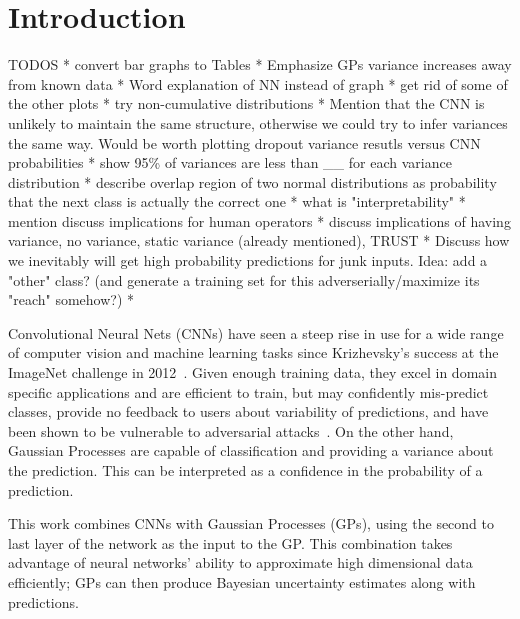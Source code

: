 \documentclass{article}
\begin{document}
\section{Introduction}

TODOS
* convert bar graphs to Tables
* Emphasize GPs variance increases away from known data
* Word explanation of NN instead of graph
* get rid of some of the other plots
* try non-cumulative distributions
* Mention that the CNN is unlikely to maintain the same structure, otherwise we could try to infer variances the same way. Would be worth plotting dropout variance resutls versus CNN probabilities
* show 95\% of variances are less than __ for each variance distribution
* describe overlap region of two normal distributions as probability that the next class is actually the correct one
* what is "interpretability"
* mention discuss implications for human operators
* discuss implications of having variance, no variance, static variance (already mentioned), TRUST
* Discuss how we inevitably will get high probability predictions for junk inputs. Idea: add a "other" class? (and generate a training set for this adverserially/maximize its "reach" somehow?)
* 

\label{sec:intro}

 
Convolutional Neural Nets (CNNs) have seen a steep rise in use for a wide range of computer vision and machine learning tasks since Krizhevsky's success at the ImageNet challenge in 2012~\cite{krizhevsky2012imagenet}. Given enough training data, they excel in domain specific applications and are efficient to train, but may confidently mis-predict classes, provide no feedback to users about variability of predictions, and have been shown to be vulnerable to adversarial attacks~\cite{szegedy2013intriguing}. On the other hand, Gaussian Processes are capable of classification and providing a variance about the prediction. This can be interpreted as a confidence in the probability of a prediction.

This work combines CNNs with Gaussian Processes (GPs), using the second to last layer of the network as the input to the GP. This combination takes advantage of neural networks' ability to approximate high dimensional data efficiently; GPs can then produce Bayesian uncertainty estimates along with predictions.
\end{document}
